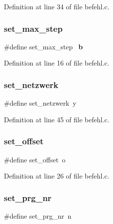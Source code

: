 Definition at line 34 of file befehl.\+c.

\mbox{\label{befehl_8c_a7b22cb957fac0eae440a57edffdd699a}} 
\subsubsection{set\+\_\+max\+\_\+step}
{\footnotesize\ttfamily \#define set\+\_\+max\+\_\+step~\textquotesingle{}\textbf{ b}\textquotesingle{}}



Definition at line 16 of file befehl.\+c.

\mbox{\label{befehl_8c_a549e81c28a458d018a8662a87b9185e6}} 
\subsubsection{set\+\_\+netzwerk}
{\footnotesize\ttfamily \#define set\+\_\+netzwerk~\textquotesingle{}y\textquotesingle{}}



Definition at line 45 of file befehl.\+c.

\mbox{\label{befehl_8c_a553f8b6e24074d13df0d3e4290d0414f}} 
\subsubsection{set\+\_\+offset}
{\footnotesize\ttfamily \#define set\+\_\+offset~\textquotesingle{}o\textquotesingle{}}



Definition at line 26 of file befehl.\+c.

\mbox{\label{befehl_8c_a63e52791e6c19ef26bbfbba0401a2833}} 
\subsubsection{set\+\_\+prg\+\_\+nr}
{\footnotesize\ttfamily \#define set\+\_\+prg\+\_\+nr~\textquotesingle{}n\textquotesingle{}}



